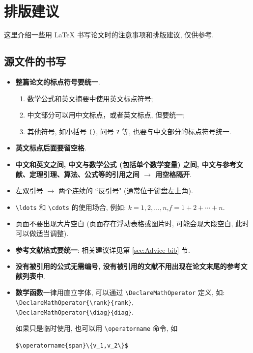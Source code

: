 \documentclass[openany]{MathematicalModelCaseStudyReport}  %
\numberwithin{algorithm}{chapter}
\newcommand{\myemph}[1]{{\bfseries\color{blue}#1}}
\DeclareMathOperator{\rank}{rank}
\DeclareMathOperator{\diag}{diag}
\begin{document}






\chapter{排版建议}

这里介绍一些用 \LaTeX{} 书写论文时的注意事项和排版建议, 仅供参考.

\section{源文件的书写}

\begin{itemize}
  \item \myemph{整篇论文的标点符号要统一}.
  \begin{enumerate}[label=$\triangleright$]
    \item 数学公式和英文摘要中使用英文标点符号;
    \item 中文部分可以用中文标点，或者英文标点, 但要统一;
    \item 其他符号, 如小括号 \Verb|()|, 问号 \Verb|?| 等, 也要与中文部分的标点符号统一.
  \end{enumerate}

  \item \myemph{英文标点后面要留空格}.

  \item \myemph{中文和英文之间, 中文与数学公式 (包括单个数学变量) 之间,
   中文与参考文献、定理引理、算法、公式等的引用之间 $\to$ 用空格隔开}.

  \item 左双引号 $\to$ 两个连续的 ``反引号" (通常位于键盘左上角).

  \item \Verb|\ldots| 和 \Verb|\cdots| 的使用场合, 例如:
    $k=1,2,\ldots,n$,\quad $f=1+2+\cdots+n$.

  \item 页面不要出现大片空白 (页面存在浮动表格或图片时, 可能会现大段空白, 此时可以做适当调整).

  \item \myemph{参考文献格式要统一}: 相关建议详见第 \ref{sec:Advice-bib} 节.
%

  \item \myemph{没有被引用的公式无需编号, 没有被引用的文献不用出现在论文末尾的参考文献列表中}.

  \item \myemph{数学函数}一律用直立字体, 可以通过 \Verb|\DeclareMathOperator| 定义, 如: \\
     \Verb|\DeclareMathOperator{\rank}{rank}|, \\
     \Verb|\DeclareMathOperator{\diag}{diag}|.

     如果只是临时使用, 也可以用 \Verb|\operatorname| 命令, 如

     \Verb|$\operatorname{span}\{v_1,v_2\}$|

\end{itemize}
\end{document}
